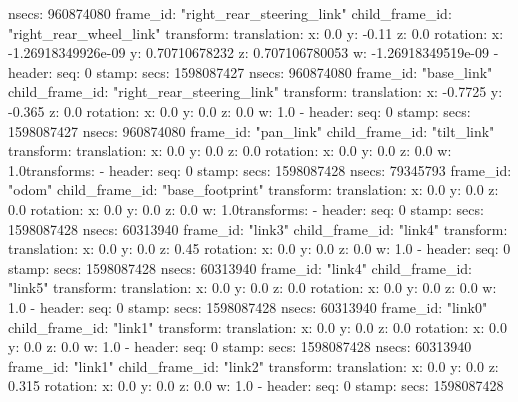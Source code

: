         nsecs: 960874080
      frame_id: "right_rear_steering_link"
    child_frame_id: "right_rear_wheel_link"
    transform: 
      translation: 
        x: 0.0
        y: -0.11
        z: 0.0
      rotation: 
        x: -1.26918349926e-09
        y: 0.70710678232
        z: 0.707106780053
        w: -1.26918349519e-09
  - 
    header: 
      seq: 0
      stamp: 
        secs: 1598087427
        nsecs: 960874080
      frame_id: "base_link"
    child_frame_id: "right_rear_steering_link"
    transform: 
      translation: 
        x: -0.7725
        y: -0.365
        z: 0.0
      rotation: 
        x: 0.0
        y: 0.0
        z: 0.0
        w: 1.0
  - 
    header: 
      seq: 0
      stamp: 
        secs: 1598087427
        nsecs: 960874080
      frame_id: "pan_link"
    child_frame_id: "tilt_link"
    transform: 
      translation: 
        x: 0.0
        y: 0.0
        z: 0.0
      rotation: 
        x: 0.0
        y: 0.0
        z: 0.0
        w: 1.0transforms: 
  - 
    header: 
      seq: 0
      stamp: 
        secs: 1598087428
        nsecs:  79345793
      frame_id: "odom"
    child_frame_id: "base_footprint"
    transform: 
      translation: 
        x: 0.0
        y: 0.0
        z: 0.0
      rotation: 
        x: 0.0
        y: 0.0
        z: 0.0
        w: 1.0transforms: 
  - 
    header: 
      seq: 0
      stamp: 
        secs: 1598087428
        nsecs:  60313940
      frame_id: "link3"
    child_frame_id: "link4"
    transform: 
      translation: 
        x: 0.0
        y: 0.0
        z: 0.45
      rotation: 
        x: 0.0
        y: 0.0
        z: 0.0
        w: 1.0
  - 
    header: 
      seq: 0
      stamp: 
        secs: 1598087428
        nsecs:  60313940
      frame_id: "link4"
    child_frame_id: "link5"
    transform: 
      translation: 
        x: 0.0
        y: 0.0
        z: 0.0
      rotation: 
        x: 0.0
        y: 0.0
        z: 0.0
        w: 1.0
  - 
    header: 
      seq: 0
      stamp: 
        secs: 1598087428
        nsecs:  60313940
      frame_id: "link0"
    child_frame_id: "link1"
    transform: 
      translation: 
        x: 0.0
        y: 0.0
        z: 0.0
      rotation: 
        x: 0.0
        y: 0.0
        z: 0.0
        w: 1.0
  - 
    header: 
      seq: 0
      stamp: 
        secs: 1598087428
        nsecs:  60313940
      frame_id: "link1"
    child_frame_id: "link2"
    transform: 
      translation: 
        x: 0.0
        y: 0.0
        z: 0.315
      rotation: 
        x: 0.0
        y: 0.0
        z: 0.0
        w: 1.0
  - 
    header: 
      seq: 0
      stamp: 
        secs: 1598087428
